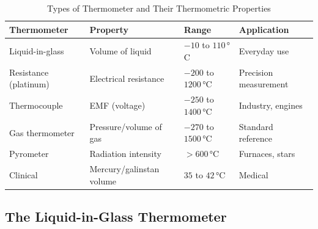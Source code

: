 \begin{table}[H]
\centering
\caption{Types of Thermometer and Their Thermometric Properties}
\label{tab:thermometers}
\begin{tabular}{llll}
\toprule
\textbf{Thermometer} & \textbf{Property} & \textbf{Range} &
\textbf{Application}\\
\midrule
Liquid-in-glass & Volume of liquid &
  $-10$ to $110\,°$C & Everyday use\\
Resistance (platinum) & Electrical resistance &
  $-200$ to $1200\,°$C & Precision measurement\\
Thermocouple & EMF (voltage) &
  $-250$ to $1400\,°$C & Industry, engines\\
Gas thermometer & Pressure/volume of gas &
  $-270$ to $1500\,°$C & Standard reference\\
Pyrometer & Radiation intensity &
  $>600\,°$C & Furnaces, stars\\
Clinical & Mercury/galinstan volume &
  $35$ to $42\,°$C & Medical\\
\bottomrule
\end{tabular}
\end{table}

\subsection{The Liquid-in-Glass Thermometer}

